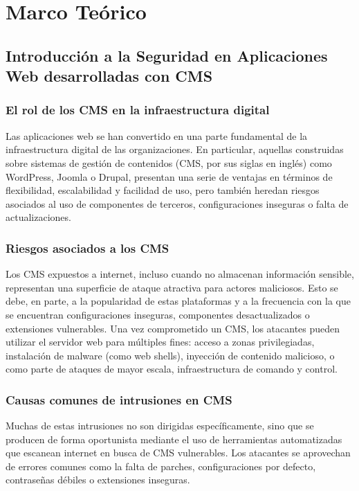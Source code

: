 \chapter{Marco Teórico}

\section{Introducción a la Seguridad en Aplicaciones Web desarrolladas con CMS}

\subsection{El rol de los CMS en la infraestructura digital}

Las aplicaciones web se han convertido en una parte fundamental de la infraestructura digital de las organizaciones. En particular, aquellas construidas sobre sistemas de gestión de contenidos (CMS, por sus siglas en inglés) como WordPress, Joomla o Drupal, presentan una serie de ventajas en términos de flexibilidad, escalabilidad y facilidad de uso, pero también heredan riesgos asociados al uso de componentes de terceros, configuraciones inseguras o falta de actualizaciones.

\subsection{Riesgos asociados a los CMS}

Los CMS expuestos a internet, incluso cuando no almacenan información sensible, representan una superficie de ataque atractiva para actores maliciosos. Esto se debe, en parte, a la popularidad de estas plataformas y a la frecuencia con la que se encuentran configuraciones inseguras, componentes desactualizados o extensiones vulnerables. Una vez comprometido un CMS, los atacantes pueden utilizar el servidor web para múltiples fines: acceso a zonas privilegiadas, instalación de malware (como web shells), inyección de contenido malicioso, o como parte de ataques de mayor escala, infraestructura de comando y control.

\subsection{Causas comunes de intrusiones en CMS}

Muchas de estas intrusiones no son dirigidas específicamente, sino que se producen de forma oportunista mediante el uso de herramientas automatizadas que escanean internet en busca de CMS vulnerables. Los atacantes se aprovechan de errores comunes como la falta de parches, configuraciones por defecto, contraseñas débiles o extensiones inseguras.

